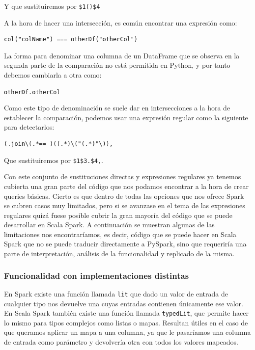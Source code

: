 \documentclass[12pt,twoside,titlepage]{report}
\begin{document}
Y que sustituiremos por \texttt{\$1()\$4}

A la hora de hacer una intersección, es común encontrar una expresión como:

\begin{lstlisting}
col("colName") === otherDf("otherCol")
\end{lstlisting}

La forma para denominar una columna de un DataFrame que se observa en la segunda parte de la comparación no está permitida en Python, y por tanto debemos cambiarla a otra como:

\texttt{otherDf.otherCol}

Como este tipo de denominación se suele dar en intersecciones a la hora de establecer la comparación, podemos usar una expresión regular como la siguiente para detectarlos:

\begin{lstlisting}
(.join\(.*== )((.*)\("(.*)"\)),
\end{lstlisting}

Que sustituiremos por \texttt{\$1\$3.\$4,}.

Con este conjunto de sustituciones directas y expresiones regulares ya tenemos cubierta una gran parte del código que nos podamos encontrar a la hora de crear queries básicas. Cierto es que dentro de todas las opciones que nos ofrece Spark se cubren casos muy limitados, pero si se avanzase en el tema de las expresiones regulares quizá fuese posible cubrir la gran mayoría del código que se puede desarrollar en Scala Spark. A continuación se muestran algunas de las limitaciones nos encontraríamos, es decir, código que se puede hacer en Scala Spark que no se puede traducir directamente a PySpark, sino que requeriría una parte de interpretación, análisis de la funcionalidad y replicado de la misma.


\subsubsection{Funcionalidad con implementaciones distintas}

En Spark existe una función llamada \texttt{lit} que dado un valor de entrada de cualquier tipo nos devuelve una cuyas entradas contienen únicamente ese valor. En Scala Spark también existe una función llamada \texttt{typedLit}, que permite hacer lo mismo para tipos complejos como listas o mapas. Resultan útiles en el caso de que queramos aplicar un mapa a una columna, ya que le pasaríamos una columna de entrada como parámetro y devolvería otra con todos los valores mapeados. 
\end{document}
